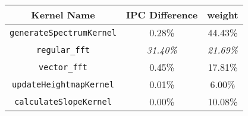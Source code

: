   \begin{tabular}{|c|c|c|}
    \hline
    \textbf{Kernel Name} & \textbf{IPC Difference} & \textbf{weight} \\
    \hline
    \hline 
    \verb|generateSpectrumKernel| & 0.28\% & 44.43\% \\
    \verb|regular_fft| & \textit{31.40\%} & \textit{21.69\%} \\
    \verb|vector_fft| & 0.45\% & 17.81\% \\
    \verb|updateHeightmapKernel| & 0.01\% & 6.00\% \\ 
    \verb|calculateSlopeKernel| & 0.00\% & 10.08\% \\
    \hline 
  \end{tabular}
